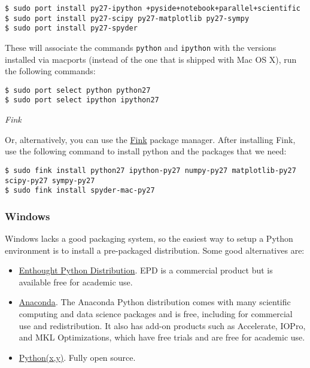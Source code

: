 \documentclass[11pt]{article}
\providecommand{\tightlist}{%
      \setlength{\itemsep}{0pt}\setlength{\parskip}{0pt}}
\begin{document}
\begin{verbatim}
$ sudo port install py27-ipython +pyside+notebook+parallel+scientific
$ sudo port install py27-scipy py27-matplotlib py27-sympy
$ sudo port install py27-spyder
\end{verbatim}

These will associate the commands \texttt{python} and \texttt{ipython}
with the versions installed via macports (instead of the one that is
shipped with Mac OS X), run the following commands:

\begin{verbatim}
$ sudo port select python python27
$ sudo port select ipython ipython27
\end{verbatim}

\emph{Fink}

Or, alternatively, you can use the
\href{http://www.finkproject.org/}{Fink} package manager. After
installing Fink, use the following command to install python and the
packages that we need:

\begin{verbatim}
$ sudo fink install python27 ipython-py27 numpy-py27 matplotlib-py27 scipy-py27 sympy-py27
$ sudo fink install spyder-mac-py27
\end{verbatim}

    \hypertarget{windows}{%
\subsubsection{Windows}\label{windows}}

    Windows lacks a good packaging system, so the easiest way to setup a
Python environment is to install a pre-packaged distribution. Some good
alternatives are:

\begin{itemize}
\tightlist
\item
  \href{http://www.enthought.com/products/epd.php}{Enthought Python
  Distribution}. EPD is a commercial product but is available free for
  academic use.
\item
  \href{http://continuum.io/downloads.html}{Anaconda}. The Anaconda
  Python distribution comes with many scientific computing and data
  science packages and is free, including for commercial use and
  redistribution. It also has add-on products such as Accelerate, IOPro,
  and MKL Optimizations, which have free trials and are free for
  academic use.
\item
  \href{http://code.google.com/p/pythonxy/}{Python(x,y)}. Fully open
  source.
\end{itemize}
\end{document}
